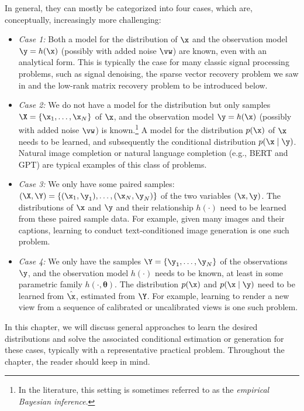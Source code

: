 \documentclass[../../book-main.tex]{subfiles}
\begin{document}
In general, they can mostly be categorized into four cases, which
are, conceptually, increasingly more challenging:
\begin{itemize}
    \item {\em Case 1:} Both a model for the distribution of $\x$ and
        the observation model $\y = h(\x)$ (possibly with added noise $\vw$) are
        known, even with an analytical form. This is typically the
        case for many classic signal processing problems, such as
        signal denoising, the sparse vector recovery problem we saw
        in  and the low-rank matrix recovery problem
        to be introduced below.
    \item {\em Case 2:} We do not have a model for the distribution
        but only samples $\X = \{\x_1, \ldots, \x_N\}$ of $\x$, and
        the observation model $\y = h(\x)$ (possibly with added noise $\vw$) is
        known.\footnote{In the literature, this setting is sometimes
        referred to as the {\em empirical Bayesian inference}.} A
        model for the distribution $p(\x)$ of $\x$ needs to be
        learned, and subsequently the conditional distribution
        $p(\x\mid \y)$. Natural image completion or natural language
        completion (e.g., BERT and GPT) are typical examples of this
        class of problems.
    \item {\em Case 3:} We only have some paired samples: $(\X, \Y) =
        \{ (\x_1, \y_1), \ldots, (\x_N, \y_N) \}$ of the two
        variables  $(\x, \y)$. The distributions of $\x$ and $\y$ and
        their relationship $h(\cdot)$ need to be learned from these
        paired sample data. For example, given many images and their
        captions, learning to conduct text-conditioned image
        generation is one such problem.
    \item {\em Case 4:} We only have the samples $\Y = \{\y_1,
        \ldots, \y_N\}$ of the observations $\y$, and the observation
        model $h(\cdot)$ needs to be known, at least in some
        parametric family $h(\cdot, \boldsymbol{\theta})$. The
        distribution $p(\x)$ and $p(\x \mid \y)$ need to be learned
        from $\hat \x$, estimated from $\Y$. For example, learning to
        render a new view from a sequence of calibrated or
        uncalibrated views is one such problem.
\end{itemize}
In this chapter, we will discuss general approaches to learn the
desired distributions and solve the associated conditional estimation
or generation for these cases, typically with a representative
practical problem. Throughout the chapter, the reader should keep
 in mind.
\end{document}
